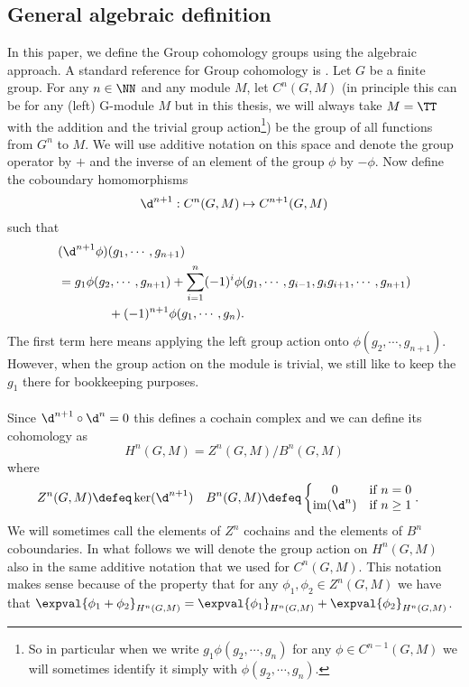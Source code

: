 \subsection{General algebraic definition}\label{sec:general-algebraic-definition}
In this paper, we define the Group cohomology groups using the algebraic approach. A standard reference for Group cohomology is \cite{benson1991representations}. Let $G$ be a finite group. For any $n\in\NN$ and any module $M$, let $C^n(G,M)$ (in principle this can be for any (left) G-module $M$ but in this thesis, we will always take $M=\TT$ with the addition and the trivial group action\footnote{So in particular when we write $g_1 \phi(g_2,\cdots,g_n)$ for any $\phi\in C^{n-1}(G,M)$ we will sometimes identify it simply with $\phi(g_2,\cdots,g_n)$.}) be the group of all functions from $G^n$ to $M$. We will use additive notation on this space and denote the group operator by $+$ and the inverse of an element of the group $\phi$ by $-\phi$. Now define the coboundary homomorphisms
\begin{equation}
\d^{n+1}:C^n(G,M)\mapsto C^{n+1}(G,M)
\end{equation}
such that
\begin{align}
&(\d^{n+1}\phi)(g_1,\cdots,g_{n+1})\\
\nonumber
&=g_1\phi(g_2,\cdots,g_{n+1})+\sum_{i=1}^n (-1)^i \phi(g_1,\cdots,g_{i-1},g_{i}g_{i+1},\cdots,g_{n+1})\\
\nonumber
&\qquad\qquad+(-1)^{n+1}\phi(g_1,\cdots,g_n).
\end{align}
The first term here means applying the left group action onto $\phi(g_2,\cdots,g_{n+1})$. However, when the group action on the module is trivial, we still like to keep the $g_1$ there for bookkeeping purposes.\\\\
Since $\d^{n+1}\circ\d^{n}=0$ this defines a cochain complex and we can define its cohomology as
\begin{equation}
H^n(G,M)=Z^n(G,M)/B^n(G,M)
\end{equation}
where
\begin{align}
Z^n(G,M)&\defeq \ker(\d^{n+1})&B^n(G,M)&\defeq \left\{\begin{matrix}
0&\text{if }n=0\\\textrm{im}(\d^n)&\text{if }n\geq 1
\end{matrix}\right. .
\end{align}
We will sometimes call the elements of $Z^n$ cochains and the elements of $B^n$ coboundaries. In what follows we will denote the group action on $H^n(G,M)$ also in the same additive notation that we used for $C^n(G,M)$. This notation makes sense because of the property that for any $\phi_1,\phi_2\in Z^n(G,M)$ we have that $\expval{\phi_1+\phi_2}_{H^n(G,M)}=\expval{\phi_1}_{H^n(G,M)}+\expval{\phi_2}_{H^n(G,M)}$.
